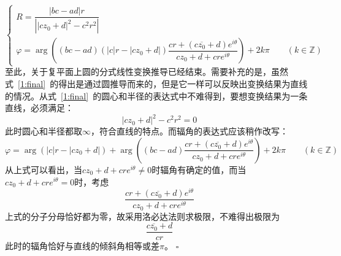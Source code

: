 \documentclass{article}
\newenvironment{SOLUTION}[1][{}]{{\noindent\heiti 解#1：}}{\hfill $\square$\par}
\begin{document}
\begin{SOLUTION}
\begin{equation}
\begin{cases}
            R=\dfrac{|bc-ad|r}{\left||cz_0+d|^2-c^2r^2\right|}\\
         \varphi=\arg \left((bc-ad)\left(|c|r-\left|cz_0+d\right|\right)\dfrac{cr+\left(c\overline{z_0}+d\right)e^{i\theta}}{cz_0+d+cre^{i\theta}}\right)+2k\pi\qquad(k\in\mathbb{Z})
        \end{cases}
        \label{1:final}
    \end{equation}
    至此，关于复平面上圆的分式线性变换推导已经结束。需要补充的是，虽然式~\eqref{1:final}~的得出是通过圆推导而来的，但是它一样可以反映出变换结果为直线的情况。从式~\eqref{1:final}~的圆心和半径的表达式中不难得到，要想变换结果为一条直线，必须满足：
    \begin{equation}
   |cz_0+d|^2-c^2r^2=0
    \end{equation}
    此时圆心和半径都取$\infty$，符合直线的特点。而辐角的表达式应该稍作改写：
    \begin{equation}
    \varphi=\arg\left(|c|r-\left|cz_0+d\right|\right)+\arg \left((bc-ad)\dfrac{cr+\left(c\overline{z_0}+d\right)e^{i\theta}}{cz_0+d+cre^{i\theta}}\right)+2k\pi\qquad(k\in\mathbb{Z})
    \end{equation}
    从上式可以看出，当$cz_0+d+cre^{i\theta}\neq 0$时辐角有确定的值，而当$cz_0+d+cre^{i\theta}= 0$时，考虑
    \begin{equation}
    \dfrac{cr+\left(c\overline{z_0}+d\right)e^{i\theta}}{cz_0+d+cre^{i\theta}}
    \end{equation}
    上式的分子分母恰好都为零，故采用洛必达法则求极限，不难得出极限为
    $$
    \dfrac{c\overline{z_0}+d}{cr}
    $$
    此时的辐角恰好与直线的倾斜角相等或差$\pi$。
    \end{SOLUTION}
\end{document}

